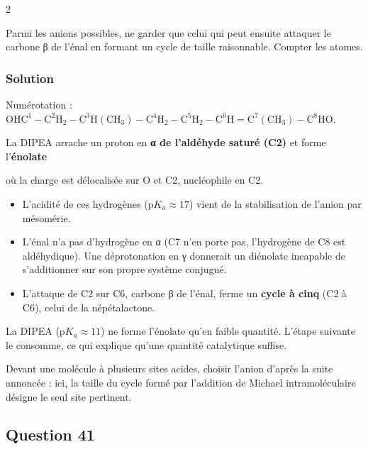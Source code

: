 \documentclass[11pt,a4paper]{article}
\providecommand{\tightlist}{\setlength{\itemsep}{0pt}\setlength{\parskip}{0pt}}
\newcommand{\equationajustee}[1]{%
  \sbox{\boiteequation}{$\displaystyle #1$}%
  \ifdim\wd\boiteequation>\linewidth
    \[\resizebox{\linewidth}{!}{\usebox{\boiteequation}}\]%
  \else
    \[#1\]%
  \fi}
\begin{document}
\begin{indication}{2}

Parmi les anions possibles, ne garder que celui qui peut ensuite attaquer le carbone β de l'énal en formant un cycle de taille raisonnable. Compter les atomes.

\end{indication}

\hypertarget{solution-39}{%
\subsubsection{Solution}\label{solution-39}}

Numérotation : \(\mathrm{OHC^1{-}C^2H_2{-}C^3H(CH_3){-}C^4H_2{-}C^5H_2{-}C^6H{=}C^7(CH_3){-}C^8HO}\).

La DIPEA arrache un proton en \textbf{α de l'aldéhyde saturé (C2)} et forme l'\textbf{énolate}

\equationajustee{\mathrm{^-O{-}C^1H{=}C^2H{-}R}\ \longleftrightarrow\ \mathrm{O{=}C^1H{-}C^2H^-{-}R}}

où la charge est délocalisée sur O et C2, nucléophile en C2.

\begin{itemize}
\tightlist
\item
  L'acidité de ces hydrogènes (\(\mathrm pK_a\approx17\)) vient de la stabilisation de l'anion par mésomérie.
\item
  L'énal n'a pas d'hydrogène en α (C7 n'en porte pas, l'hydrogène de C8 est aldéhydique). Une déprotonation en γ donnerait un diénolate incapable de s'additionner sur son propre système conjugué.
\item
  L'attaque de C2 sur C6, carbone β de l'énal, ferme un \textbf{cycle à cinq} (C2 à C6), celui de la népétalactone.
\end{itemize}

La DIPEA (\(\mathrm pK_a\approx11\)) ne forme l'énolate qu'en faible quantité. L'étape suivante le consomme, ce qui explique qu'une quantité catalytique suffise.

\begin{methode}

Devant une molécule à plusieurs sites acides, choisir l'anion d'après la suite annoncée : ici, la taille du cycle formé par l'addition de Michael intramoléculaire désigne le seul site pertinent.

\end{methode}

\hypertarget{question-41}{%
\subsection{Question 41}\label{question-41}}
\end{document}
